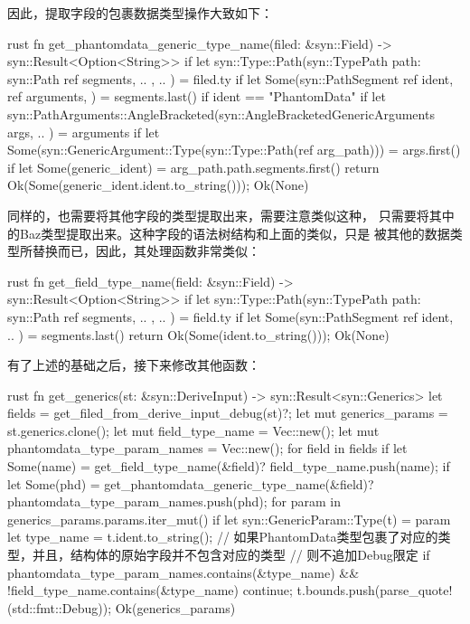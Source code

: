 因此，提取字段的包裹数据类型操作大致如下：
\begin{code-block}{rust}
fn get_phantomdata_generic_type_name(filed: &syn::Field) -> syn::Result<Option<String>> {
    if let syn::Type::Path(syn::TypePath {
        path: syn::Path { ref segments, .. },
        ..
    }) = filed.ty {
        if let Some(syn::PathSegment {
            ref ident, ref arguments,
        }) = segments.last()
        {
            if ident == "PhantomData" {
                if let syn::PathArguments::AngleBracketed(syn::AngleBracketedGenericArguments { args, .. }) = arguments
                {
                    if let Some(syn::GenericArgument::Type(syn::Type::Path(ref arg_path))) = args.first()
                    {
                        if let Some(generic_ident) = arg_path.path.segments.first() {
                            return Ok(Some(generic_ident.ident.to_string()));
                        }
                    }
                }
            }
        }
    }
    Ok(None)
}
\end{code-block}
同样的，也需要将其他字段的类型提取出来，需要注意类似这种，
只需要将其中的Baz类型提取出来。这种字段的语法树结构和上面的类似，只是
被其他的数据类型所替换而已，因此，其处理函数非常类似：
\begin{code-block}{rust}
fn get_field_type_name(field: &syn::Field) -> syn::Result<Option<String>> {
    if let syn::Type::Path(syn::TypePath { path: syn::Path { ref segments, .. }, .. }) = field.ty
    {
        if let Some(syn::PathSegment { ref ident, .. }) = segments.last() {
            return Ok(Some(ident.to_string()));
        }
    }
    Ok(None)
}
\end{code-block}

有了上述的基础之后，接下来修改其他函数：
\begin{code-block}{rust}
fn get_generics(st: &syn::DeriveInput) -> syn::Result<syn::Generics> {
    let fields = get_filed_from_derive_input_debug(st)?;
    let mut generics_params = st.generics.clone();
    let mut field_type_name = Vec::new();
    let mut phantomdata_type_param_names = Vec::new();
    for field in fields {
        if let Some(name) = get_field_type_name(&field)? {
            field_type_name.push(name);
        }
        if let Some(phd) = get_phantomdata_generic_type_name(&field)? {
            phantomdata_type_param_names.push(phd);
        }
    }
    for param in generics_params.params.iter_mut() {
        if let syn::GenericParam::Type(t) = param {
            let type_name = t.ident.to_string();
            // 如果PhantomData类型包裹了对应的类型，并且，结构体的原始字段并不包含对应的类型
            // 则不追加Debug限定
            if phantomdata_type_param_names.contains(&type_name)
                && !field_type_name.contains(&type_name)
            {
                continue;
            }
            t.bounds.push(parse_quote!(std::fmt::Debug));
        }
    }
    Ok(generics_params)
}
\end{code-block}


